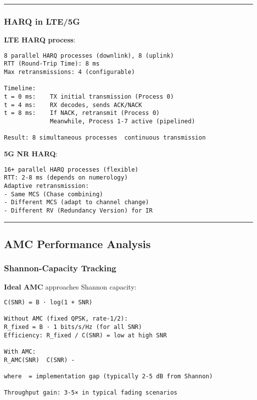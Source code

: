 \begin{center}\rule{0.5\linewidth}{0.5pt}\end{center}

\subsubsection{HARQ in LTE/5G}\label{harq-in-lte5g}

\textbf{LTE HARQ process}:

\begin{verbatim}
8 parallel HARQ processes (downlink), 8 (uplink)
RTT (Round-Trip Time): 8 ms
Max retransmissions: 4 (configurable)

Timeline:
t = 0 ms:    TX initial transmission (Process 0)
t = 4 ms:    RX decodes, sends ACK/NACK
t = 8 ms:    If NACK, retransmit (Process 0)
             Meanwhile, Process 1-7 active (pipelined)

Result: 8 simultaneous processes  continuous transmission
\end{verbatim}

\textbf{5G NR HARQ}:

\begin{verbatim}
16+ parallel HARQ processes (flexible)
RTT: 2-8 ms (depends on numerology)
Adaptive retransmission:
- Same MCS (Chase combining)
- Different MCS (adapt to channel change)
- Different RV (Redundancy Version) for IR
\end{verbatim}

\begin{center}\rule{0.5\linewidth}{0.5pt}\end{center}

\subsection{\texorpdfstring{ AMC Performance
Analysis}{ AMC Performance Analysis}}\label{amc-performance-analysis}

\subsubsection{Shannon-Capacity
Tracking}\label{shannon-capacity-tracking}

\textbf{Ideal AMC} approaches Shannon capacity:

\begin{verbatim}
C(SNR) = B · log(1 + SNR)

Without AMC (fixed QPSK, rate-1/2):
R_fixed = B · 1 bits/s/Hz (for all SNR)
Efficiency: R_fixed / C(SNR) = low at high SNR

With AMC:
R_AMC(SNR)  C(SNR) - 

where  = implementation gap (typically 2-5 dB from Shannon)

Throughput gain: 3-5× in typical fading scenarios
\end{verbatim}

